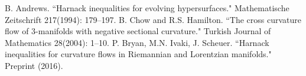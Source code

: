 \documentclass{amsart}
\theoremstyle{definition}
\theoremstyle{remark}
\numberwithin{equation}{section}
\begin{document}

\begin{thebibliography}{10}
 B. Andrews. ``Harnack inequalities for evolving hypersurfaces." Mathematische Zeitschrift 217(1994): 179--197.
 B. Chow and R.S. Hamilton. ``The cross curvature flow of 3-manifolds with negative sectional curvature." Turkish Journal of Mathematics 28(2004): 1--10.
 P. Bryan, M.N. Ivaki, J. Scheuer. ``Harnack inequalities for curvature flows in Riemannian and Lorentzian manifolds." Preprint (2016).
\end{thebibliography}
\end{document}
